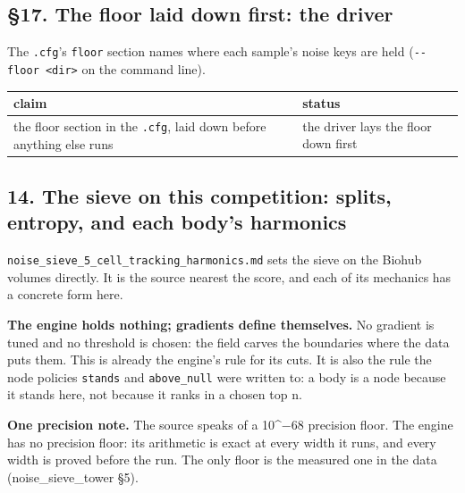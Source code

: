 \subsection{\texorpdfstring{§17. The floor laid down first: the driver}{§17. The floor laid down first: the driver}}

The \texttt{.\allowbreak{}cfg}'s \texttt{floor} section names where each sample's noise keys are held (\texttt{-\allowbreak{}-\allowbreak{}floor <dir>} on the command line).

{\small
\setlength{\tabcolsep}{6pt}
\begin{longtable}{>{\RaggedRight\arraybackslash}p{}>{\RaggedRight\arraybackslash}p{}}
\toprule
claim & status \\
\midrule
\endhead
the floor section in the \texttt{.\allowbreak{}cfg}, laid down before anything else runs & the driver lays the floor down first \\
\bottomrule
\end{longtable}
}

\subsection{\texorpdfstring{14. The sieve on this competition: splits, entropy, and each body's harmonics}{14. The sieve on this competition: splits, entropy, and each body's harmonics}}

\texttt{noise\_\allowbreak{}sieve\_\allowbreak{}5\_\allowbreak{}cell\_\allowbreak{}tracking\_\allowbreak{}harmonics.\allowbreak{}md} sets the sieve on the Biohub volumes directly. It is the source nearest the score, and each of its mechanics has a concrete form here.

\textbf{The engine holds nothing; gradients define themselves.} No gradient is tuned and no threshold is chosen: the field carves the boundaries where the data puts them. This is already the engine's rule for its cuts. It is also the rule the node policies \texttt{stands} and \texttt{above\_\allowbreak{}null} were written to: a body is a node because it stands here, not because it ranks in a chosen top n.

\textbf{One precision note.} The source speaks of a 10\textasciicircum{}−68 precision floor. The engine has no precision floor: its arithmetic is exact at every width it runs, and every width is proved before the run. The only floor is the measured one in the data (noise\_\allowbreak{}sieve\_\allowbreak{}tower §5).

